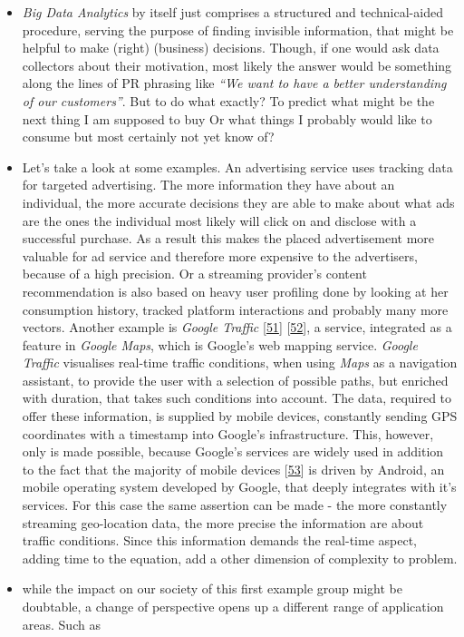 \documentclass[12pt,english,a4paper,titlepage,cleardoublepage=empty,dottedtoc]{report}
\begin{document}
\begin{itemize}
\item
  \emph{Big Data Analytics} by itself just comprises a structured and
  technical-aided procedure, serving the purpose of finding invisible
  information, that might be helpful to make (right) (business)
  decisions. Though, if one would ask data collectors about their
  motivation, most likely the answer would be something along the lines
  of PR phrasing like \emph{``We want to have a better understanding of
  our customers''}. But to do what exactly? To predict what might be the
  next thing I am supposed to buy Or what things I probably would like
  to consume but most certainly not yet know of?
\item
  Let's take a look at some examples. An advertising service uses
  tracking data for targeted advertising. The more information they have
  about an individual, the more accurate decisions they are able to make
  about what ads are the ones the individual most likely will click on
  and disclose with a successful purchase. As a result this makes the
  placed advertisement more valuable for ad service and therefore more
  expensive to the advertisers, because of a high precision. Or a
  streaming provider's content recommendation is also based on heavy
  user profiling done by looking at her consumption history, tracked
  platform interactions and probably many more vectors. Another example
  is \emph{Google Traffic}
  {[}\protect\hyperlink{ref-web_2007_introducing-google-traffic}{51}{]}
  {[}\protect\hyperlink{ref-web_2016_wikipedia_google-traffic}{52}{]}, a
  service, integrated as a feature in \emph{Google Maps}, which is
  Google's web mapping service. \emph{Google Traffic} visualises
  real-time traffic conditions, when using \emph{Maps} as a navigation
  assistant, to provide the user with a selection of possible paths, but
  enriched with duration, that takes such conditions into account. The
  data, required to offer these information, is supplied by mobile
  devices, constantly sending GPS coordinates with a timestamp into
  Google's infrastructure. This, however, only is made possible, because
  Google's services are widely used in addition to the fact that the
  majority of mobile devices
  {[}\protect\hyperlink{ref-graphic_2016_global-mobile-os-market-share}{53}{]}
  is driven by Android, an mobile operating system developed by Google,
  that deeply integrates with it's services. For this case the same
  assertion can be made - the more constantly streaming geo-location
  data, the more precise the information are about traffic conditions.
  Since this information demands the real-time aspect, adding time to
  the equation, add a other dimension of complexity to problem.
\item
  while the impact on our society of this first example group might be
  doubtable, a change of perspective opens up a different range of
  application areas. Such as


\end{itemize}
\end{document}
